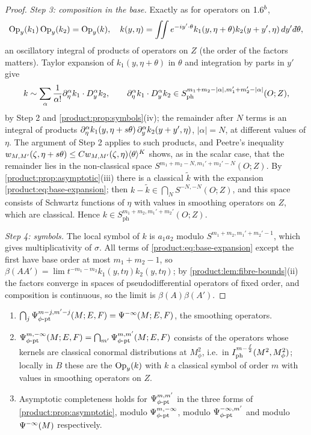 \begin{proof}
\emph{Step 3: composition in the base.} Exactly as for operators on $1.6^b$,
\begin{equation*}
\Op_y(k_1)\Op_y(k_2)=\Op_y(k),\quad k(y,\eta)=\iint e^{-iy'\cdot\theta}
k_1(y,\eta+\theta)k_2(y+y',\eta)\,dy'\,\dbar\theta,
\end{equation*}
an oscillatory integral of products of operators on $Z$ (the order of the factors
matters). Taylor expansion of $k_1(y,\eta+\theta)$ in $\theta$ and integration by
parts in $y'$ give
\begin{equation}\label{product:eq:base-expansion}
k\sim\sum_\alpha\frac1{\alpha!}\partial_\eta^\alpha k_1\cdot D_y^\alpha k_2,\qquad
\partial_\eta^\alpha k_1\cdot D_y^\alpha k_2\in
S^{m_1+m_2-|\alpha|,m_1'+m_2'-|\alpha|}_{\mathrm{ph}}(O;Z),
\end{equation}
by Step 2 and \cref{product:prop:symbols}(iv); the remainder after $N$ terms is an
integral of products $\partial_\eta^\alpha k_1(y,\eta+s\theta)\,\partial_y^\alpha
k_2(y+y',\eta)$, $|\alpha|=N$, at different values of $\eta$. The argument of Step 2
applies to such products, and Peetre's inequality
$w_{M,M'}(\zeta,\eta+s\theta)\le Cw_{M,M'}(\zeta,\eta)\langle \theta\rangle^K$ shows, as in the
scalar case, that the remainder lies in the non-classical space
$S^{m_1+m_2-N,m_1'+m_2'-N}(O;Z)$. By \cref{product:prop:asymptotic}(iii) there is a
classical $\tilde k$ with the expansion \eqref{product:eq:base-expansion}; then
$k-\tilde k\in\bigcap_NS^{-N,-N}(O;Z)$, and this space consists of Schwartz
functions of $\eta$ with values in smoothing operators on $Z$, which are classical.
Hence $k\in S^{m_1+m_2,m_1'+m_2'}_{\mathrm{ph}}(O;Z)$.

\emph{Step 4: symbols.} The local symbol of $k$ is $a_1a_2$ modulo
$S^{m_1+m_2,m_1'+m_2'-1}$, which gives multiplicativity of $\sigma$. All terms of
\eqref{product:eq:base-expansion} except the first have base order at most
$m_1+m_2-1$, so $\beta(AA')=\lim t^{-m_1-m_2}k_1(y,t\eta)k_2(y,t\eta)$; by
\cref{product:lem:fibre-bounds}(ii) the factors converge in spaces of
pseudodifferential operators of fixed order, and composition is continuous, so the
limit is $\beta(A)\beta(A')$.
\end{proof}

\begin{proposition}\label{product:prop:residual}
\begin{enumerate}[label=\textup{(\roman*)}]
\item $\bigcap_j\Psi^{m-j,m'-j}_{\phi\text{-}\mathrm{pt}}(M;E,F)=\Psi^{-\infty}(M;E,F)$, the smoothing
operators.
\item $\Psi^{m,-\infty}_{\phi\text{-}\mathrm{pt}}(M;E,F)=\bigcap_{m'}\Psi^{m,m'}_{\phi\text{-}\mathrm{pt}}(M;E,F)$ consists of the
operators whose kernels are classical conormal distributions at $M^2_\phi$, i.e.\ in
$I^{m-\frac f2}_{\mathrm{ph}}(M^2,M^2_\phi)$; locally
in $B$ these are the $\operatorname{Op}_y(k)$ with $k$ a classical symbol of order $m$ with
values in smoothing operators on $Z$.
\item Asymptotic completeness holds for $\Psi^{m,m'}_{\phi\text{-}\mathrm{pt}}$ in the three forms of
\cref{product:prop:asymptotic}, modulo $\Psi^{m,-\infty}_{\phi\text{-}\mathrm{pt}}$, modulo
$\Psi^{-\infty,m'}_{\phi\text{-}\mathrm{pt}}$ and modulo $\Psi^{-\infty}(M)$ respectively.
\end{enumerate}
\end{proposition}

